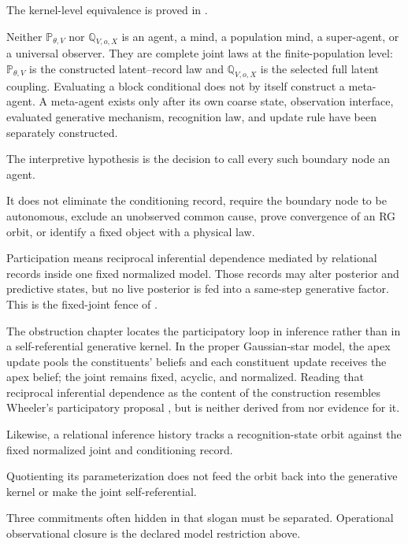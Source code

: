 The kernel-level equivalence is proved in
. 

Neither \(\mathbb P_{\theta,V}\) nor \(\mathbb Q_{V,o,X}\) is an agent, a
mind, a population mind, a super-agent, or a universal observer.  They are
complete joint laws at the finite-population level: \(\mathbb P_{\theta,V}\)
is the constructed latent--record law and \(\mathbb Q_{V,o,X}\) is the
selected full latent coupling.  Evaluating a block conditional does not by
itself construct a meta-agent.  A meta-agent exists only after its own coarse
state, observation interface, evaluated generative mechanism, recognition
law, and update rule have been separately constructed. 

The interpretive hypothesis is the decision to call every such boundary node
an agent. 

It does not eliminate the conditioning record, require the boundary node to
be autonomous, exclude an unobserved common cause, prove convergence of an RG
orbit, or identify a fixed object with a physical law. 

Participation means reciprocal inferential dependence mediated by relational
records inside one fixed normalized model.  Those records may alter posterior
and predictive states, but no live posterior is fed into a same-step
generative factor.  This is the fixed-joint fence of
. 

The obstruction chapter locates the participatory loop in inference rather
than in a self-referential generative kernel.  In the proper Gaussian-star
model, the apex update pools the constituents' beliefs and each constituent
update receives the apex belief; the joint remains fixed, acyclic, and
normalized.  Reading that reciprocal inferential dependence as the content of
the construction resembles Wheeler's participatory proposal
\citep{Wheeler1990}, but is neither derived from nor evidence for it.

Likewise, a relational inference history tracks a recognition-state orbit
against the fixed normalized joint and conditioning record. 

Quotienting its
parameterization does not feed the orbit back into the generative kernel or
make the joint self-referential. 

Three commitments often hidden in that slogan must be separated.
Operational observational closure is the declared model restriction above.

